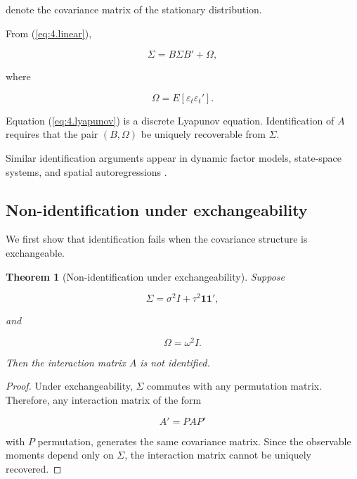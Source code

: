 \documentclass[12pt]{article}
\numberwithin{equation}{section}
\newtheorem{theorem}{Theorem}[section]
\begin{document}
denote the covariance matrix of the stationary distribution.

From (\ref{eq:4.linear}),

\begin{equation}
\Sigma
=
B \Sigma B'
+
\Omega,
\label{eq:4.lyapunov}
\end{equation}

where

\begin{equation}
\Omega
=
E[\varepsilon_t \varepsilon_t'].
\label{eq:4.omega}
\end{equation}

Equation (\ref{eq:4.lyapunov}) is a discrete Lyapunov equation.
Identification of $A$ requires that the pair $(B,\Omega)$ be uniquely
recoverable from $\Sigma$.

Similar identification arguments appear in dynamic factor models,
state-space systems, and spatial autoregressions
\citep{bai2003inferential, anselin1988spatial, hamilton1994timeseries}.

\subsection{Non-identification under exchangeability}

We first show that identification fails when the covariance structure is
exchangeable.

\begin{theorem}[Non-identification under exchangeability]
Suppose

\begin{equation}
\Sigma
=
\sigma^2 I
+
\tau^2 \mathbf{1}\mathbf{1}',
\label{eq:4.exchangeable}
\end{equation}

and

\begin{equation}
\Omega
=
\omega^2 I.
\label{eq:4.exchangeable2}
\end{equation}

Then the interaction matrix $A$ is not identified.
\end{theorem}

\begin{proof}
Under exchangeability, $\Sigma$ commutes with any permutation matrix.
Therefore, any interaction matrix of the form

\begin{equation}
A'
=
P A P'
\label{eq:4.permutation}
\end{equation}

with $P$ permutation, generates the same covariance matrix.
Since the observable moments depend only on $\Sigma$, the interaction
matrix cannot be uniquely recovered.
\end{proof}
\end{document}
